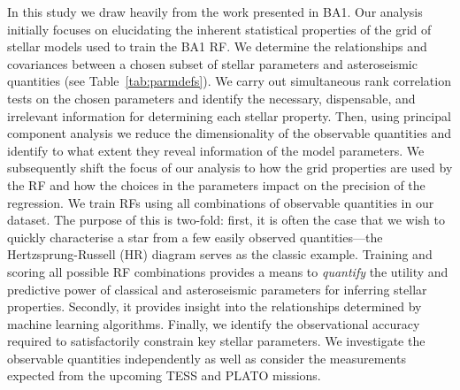 In this study we draw heavily from the work presented in BA1.
Our analysis initially focuses on elucidating the inherent statistical properties of the grid of stellar models used to train the BA1 RF. 
We determine the relationships and covariances between a chosen subset of stellar parameters and asteroseismic quantities (see Table~\ref{tab:parmdefs}). 
We carry out simultaneous rank correlation tests on the chosen parameters and identify the necessary, dispensable, and irrelevant information for determining each stellar property.
Then, using principal component analysis %
we reduce the dimensionality of the observable quantities and identify to what extent they reveal information of the model parameters.
We subsequently shift the focus of our analysis to how the grid properties are used by the RF and how the choices in the parameters impact on the precision of the regression. 
We train RFs using all combinations of observable quantities in our dataset. The purpose of this is two-fold: first, it is often the case that we wish to quickly characterise a star from a few easily observed quantities---the Hertzsprung-Russell (HR) diagram serves as the classic example. Training and scoring all possible RF combinations provides a means to \emph{quantify} the utility and predictive power of classical and asteroseismic parameters for inferring stellar properties. Secondly, it provides insight into the relationships determined by machine learning algorithms. 
Finally, we identify the observational accuracy required to satisfactorily constrain key stellar parameters. We investigate the observable quantities independently as well as consider the measurements expected from the upcoming TESS and PLATO missions.


